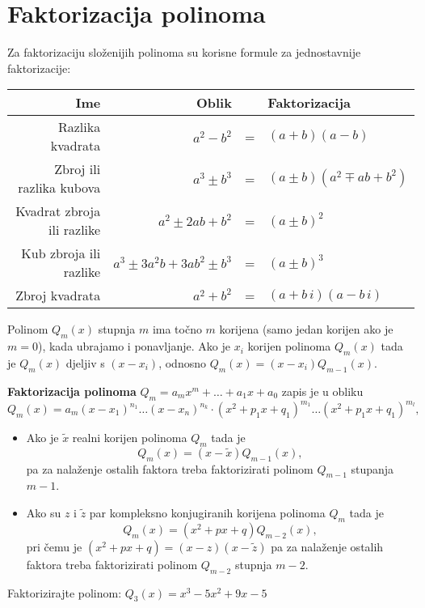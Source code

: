 \section{Faktorizacija polinoma}

Za faktorizaciju složenijih polinoma su korisne formule za jednostavnije
faktorizacije:

\begin{center}
    \begin{tabular}{r|rcl}
        Ime & Oblik && Faktorizacija \\
        \hline
        Razlika kvadrata & $a^2 - b^2$ &=& $(a+b)(a-b)$ \\
        Zbroj ili razlika kubova & $a^3 \pm b^3$ &=& $(a \pm b)(a^2 \mp ab + b^2)$ \\
        Kvadrat zbroja ili razlike & $a^2 \pm 2ab + b^2$ &=& $(a \pm b)^2$ \\
        Kub zbroja ili razlike & $a^3 \pm 3a^2b + 3ab^2 \pm b^3$ &=& $(a \pm b)^3$ \\
        \hline
        \hline
        Zbroj kvadrata & $a^2 + b^2$ &=& $(a+b\,i)(a-b\,i)$ \\
    \end{tabular}
\end{center}

\noindent
Polinom $Q_m(x)$ stupnja $m$ ima točno $m$ korijena (samo jedan korijen ako je
$m=0$), kada ubrajamo i ponavljanje. Ako je $x_i$ korijen polinoma $Q_m(x)$ tada
je $Q_m(x)$ djeljiv s $(x-x_i)$, odnosno $Q_m(x) = (x-x_i)Q_{m-1}(x)$.

\textbf{Faktorizacija polinoma} $Q_m=a_mx^m+\dots+a_1x+a_0$ zapis je u obliku
$$
Q_m(x) = a_m(x-x_1)^{n_1}\dots(x-x_n)^{n_k}\cdot(x^2+p_1x+q_1)^{m_1}\dots(x^2+p_1x+q_1)^{m_l},
$$

\begin{itemize}
    \item Ako je $\tilde{x}$ realni korijen polinoma $Q_m$ tada je
    $$
    Q_m(x) = (x-\tilde{x})Q_{m-1}(x),
    $$
    pa za nalaženje ostalih faktora treba faktorizirati polinom $Q_{m-1}$
    stupanja $m-1$.
    \item Ako su $z$ i $\tilde{z}$ par kompleksno konjugiranih korijena polinoma
    $Q_m$ tada je
    $$
    Q_m(x) = (x^2+px+q)Q_{m-2}(x),
    $$
    pri čemu je $(x^2+px+q) = (x-z)(x-\tilde{z})$ pa za nalaženje ostalih
    faktora treba faktorizirati polinom $Q_{m-2}$ stupnja $m-2$.
\end{itemize}

\begin{example}
    Faktorizirajte polinom:
    $Q_3(x) = x^3-5x^2+9x-5$
\end{example}

